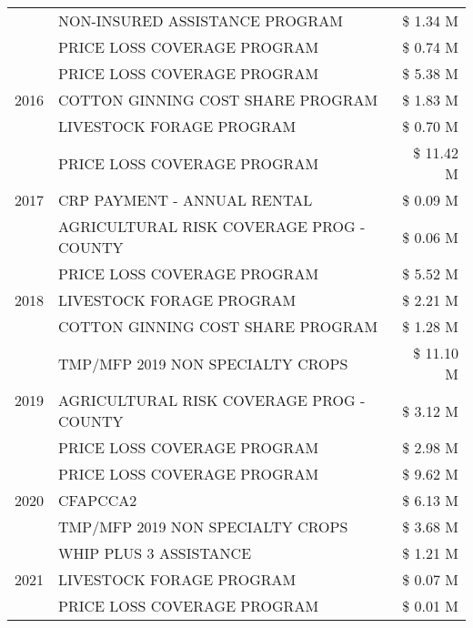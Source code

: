 \begin{tabular}{llr}
 & NON-INSURED ASSISTANCE PROGRAM & \$ 1.34 M \\
 & PRICE LOSS COVERAGE PROGRAM & \$ 0.74 M \\
\cline{1-3}
\multirow[t]{3}{*}{2016} & PRICE LOSS COVERAGE PROGRAM & \$ 5.38 M \\
 & COTTON GINNING COST SHARE PROGRAM & \$ 1.83 M \\
 & LIVESTOCK FORAGE PROGRAM & \$ 0.70 M \\
\cline{1-3}
\multirow[t]{3}{*}{2017} & PRICE LOSS COVERAGE PROGRAM & \$ 11.42 M \\
 & CRP PAYMENT - ANNUAL RENTAL & \$ 0.09 M \\
 & AGRICULTURAL RISK COVERAGE PROG - COUNTY & \$ 0.06 M \\
\cline{1-3}
\multirow[t]{3}{*}{2018} & PRICE LOSS COVERAGE PROGRAM & \$ 5.52 M \\
 & LIVESTOCK FORAGE PROGRAM & \$ 2.21 M \\
 & COTTON GINNING COST SHARE PROGRAM & \$ 1.28 M \\
\cline{1-3}
\multirow[t]{3}{*}{2019} & TMP/MFP 2019 NON SPECIALTY CROPS & \$ 11.10 M \\
 & AGRICULTURAL RISK COVERAGE PROG - COUNTY & \$ 3.12 M \\
 & PRICE LOSS COVERAGE PROGRAM & \$ 2.98 M \\
\cline{1-3}
\multirow[t]{3}{*}{2020} & PRICE LOSS COVERAGE PROGRAM & \$ 9.62 M \\
 & CFAPCCA2 & \$ 6.13 M \\
 & TMP/MFP 2019 NON SPECIALTY CROPS & \$ 3.68 M \\
\cline{1-3}
\multirow[t]{3}{*}{2021} & WHIP PLUS 3 ASSISTANCE & \$ 1.21 M \\
 & LIVESTOCK FORAGE PROGRAM & \$ 0.07 M \\
 & PRICE LOSS COVERAGE PROGRAM & \$ 0.01 M \\
\cline{1-3}
\bottomrule
\end{tabular}
